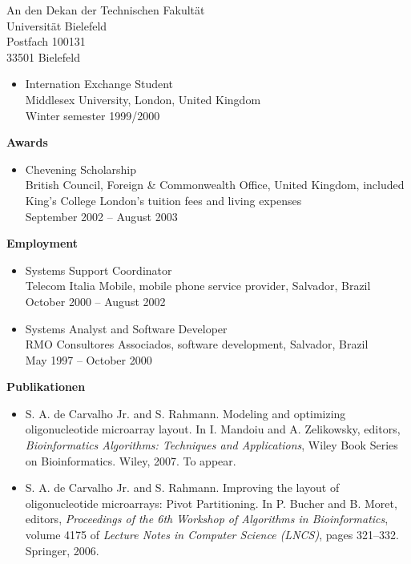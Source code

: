 \documentclass[a4paper,11pt]{letter}
\begin{document}
\begin{letter}{
  An den Dekan der Technischen Fakult\"at\\
  Universit\"at Bielefeld\\
  Postfach 100131\\
  33501 Bielefeld
}
\begin{itemize}
\item Internation Exchange Student\\
      Middlesex University, London, United Kingdom\\
      Winter semester 1999/2000

\end{itemize}

{\bf Awards}
\begin{itemize}

\item Chevening Scholarship\\
      British Council, Foreign \& Commonwealth Office, United Kingdom, included
      King's College London's tuition fees and living expenses\\
      September 2002 -- August 2003

\end{itemize}

{\bf Employment}
\begin{itemize}

\item Systems Support Coordinator\\
      Telecom Italia Mobile, mobile phone service provider, Salvador, Brazil\\
      October 2000 -- August 2002

\item Systems Analyst and Software Developer\\
      RMO Consultores Associados, software development, Salvador, Brazil\\
      May 1997 -- October 2000

\end{itemize}

\newpage
{\bf\large Publikationen}

\begin{itemize}
\item S. A. de Carvalho Jr. and S. Rahmann. Modeling and optimizing
oligonucleotide microarray layout. In I. Mandoiu and A. Zelikowsky, editors,
\emph{Bioinformatics Algorithms: Techniques and Applications}, Wiley Book Series
on Bioinformatics. Wiley, 2007. To appear.

\item S. A. de Carvalho Jr. and S. Rahmann. Improving the layout of
oligonucleotide microarrays: Pivot Partitioning. In P. Bucher and B. Moret,
editors, \emph{Proceedings of the 6th Workshop of Algorithms in Bioinformatics},
volume 4175 of \emph{Lecture Notes in Computer Science (LNCS)}, pages 321--332.
Springer, 2006.


\end{itemize}
\end{letter}
\end{document}
